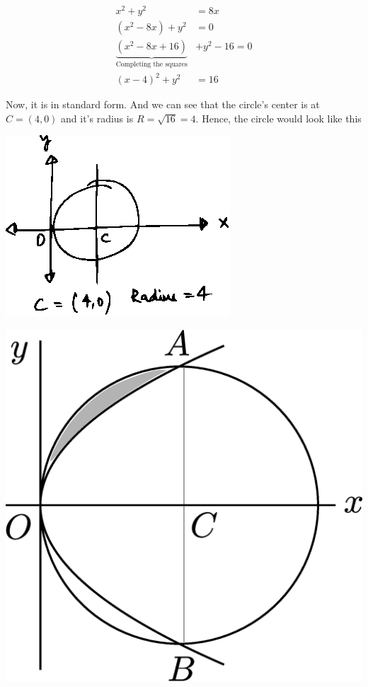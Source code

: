 \documentclass[14pt,fleqn]{extarticle}
\begin{document}
\begin{question}
\begin{step}
     \begin{align}
x^2 + y^2 &= 8x \\
\left(x^2-8x \right)	 + y^2 &= 0 \\
\underbrace{\left(x^2-8x + 16 \right)}_{\text{Completing the squares}} &+ y^2 - 16 = 0 \\
\left(x-4 \right)^2 + y^2 &= 16 
\end{align}
       
       Now, it is in standard form. And we can see that the circle's center is at $C = \left(4,0 \right)$ and it's radius is $R = \sqrt{16} = 4$. Hence, the circle would look like this 
       
       \begin{center}
\includegraphics[scale=1.2]{1381-A.eps}
\end{center}
\end{step} 

\begin{step}
  \begin{options} 
     \correct 
       
       \begin{center}
\includegraphics[scale=0.2]{1381-C.eps}
\end{center}


\end{options}
\end{step}
\end{question}
\end{document}
